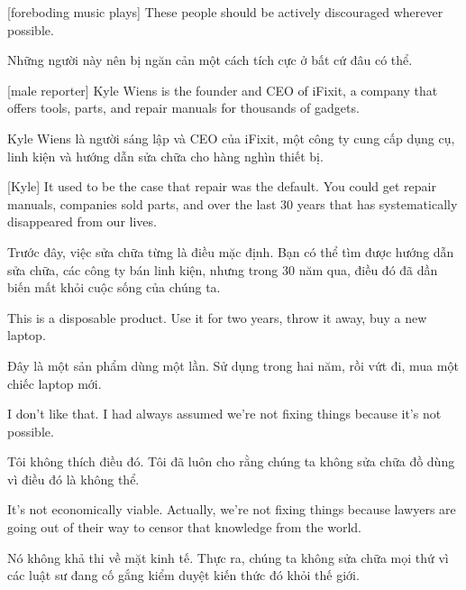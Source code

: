 \documentclass[a4paper]{article}
\begin{document}
	
	[foreboding music plays]
	These people should be actively discouraged wherever possible.
	
	\begin{vietnamese-v2}
		 Những người này nên bị ngăn cản một cách tích cực ở bất cứ đâu có thể.
	\end{vietnamese-v2}
	
	[male reporter] Kyle Wiens is the founder and CEO of iFixit, a company that offers tools, parts, and repair manuals for thousands of gadgets.
	
	\begin{vietnamese-v2}
		 Kyle Wiens là người sáng lập và CEO của iFixit, một công ty cung cấp dụng cụ, linh kiện và hướng dẫn sửa chữa cho hàng nghìn thiết bị.
	\end{vietnamese-v2}
	
	[Kyle] It used to be the case that repair was the default.
	You could get repair manuals, companies sold parts, and over the last 30 years that has systematically disappeared from our lives.
	
	\begin{vietnamese-v2}
		[Kyle] Trước đây, việc sửa chữa từng là điều mặc định. Bạn có thể tìm được hướng dẫn sửa chữa, các công ty bán linh kiện, nhưng trong 30 năm qua, điều đó đã dần biến mất khỏi cuộc sống của chúng ta.
	\end{vietnamese-v2}
	
	This is a disposable product.
	Use it for two years, throw it away, buy a new laptop.
	
	\begin{vietnamese-v2}
		Đây là một sản phẩm dùng một lần.
		Sử dụng trong hai năm, rồi vứt đi, mua một chiếc laptop mới.
	\end{vietnamese-v2}
	
	I don't like that.
	I had always assumed we're not fixing things because it's not possible.
	
	\begin{vietnamese-v2}
		Tôi không thích điều đó. Tôi đã luôn cho rằng chúng ta không sửa chữa đồ dùng vì điều đó là không thể.
	\end{vietnamese-v2}
	
	It's not economically viable.
	Actually, we're not fixing things because lawyers are going out of their way to censor that knowledge from the world.
	
	\begin{vietnamese-v2}
		Nó không khả thi về mặt kinh tế.
		Thực ra, chúng ta không sửa chữa mọi thứ vì các luật sư đang cố gắng kiểm duyệt kiến thức đó khỏi thế giới.
	\end{vietnamese-v2}
	
\end{document}
